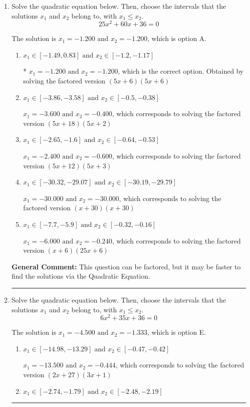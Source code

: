\documentclass{extbook}[14pt]
\newcommand{\litem}[1]{\item #1

\rule{\textwidth}{0.4pt}}
\begin{document}
\begin{enumerate}\litem{
Solve the quadratic equation below. Then, choose the intervals that the solutions $x_1$ and $x_2$ belong to, with $x_1 \leq x_2$.
\[ 25x^{2} +60 x + 36 = 0 \]

The solution is \( x_1 = -1.200 \text{ and } x_2 = -1.200 \), which is option A.\begin{enumerate}[label=\Alph*.]
\item \( x_1 \in [-1.49, 0.83] \text{ and } x_2 \in [-1.2, -1.17] \)

* $x_1 = -1.200 \text{ and } x_2 = -1.200$, which is the correct option. Obtained by solving the factored version $(5x + 6)(5x + 6)$
\item \( x_1 \in [-3.86, -3.58] \text{ and } x_2 \in [-0.5, -0.38] \)

$x_1 = -3.600 \text{ and } x_2 = -0.400$, which corresponds to solving the factored version $(5x + 18)(5x + 2)$
\item \( x_1 \in [-2.65, -1.6] \text{ and } x_2 \in [-0.64, -0.53] \)

$x_1 = -2.400 \text{ and } x_2 = -0.600$, which corresponds to solving the factored version $(5x + 12)(5x + 3)$
\item \( x_1 \in [-30.32, -29.07] \text{ and } x_2 \in [-30.19, -29.79] \)

$x_1 = -30.000 \text{ and } x_2 = -30.000$, which corresponds to solving the factored version $(x + 30)(x + 30)$
\item \( x_1 \in [-7.7, -5.9] \text{ and } x_2 \in [-0.32, -0.16] \)

$x_1 = -6.000 \text{ and } x_2 = -0.240$, which corresponds to solving the factored version $(x + 6)(25x + 6)$
\end{enumerate}

\textbf{General Comment:} This question can be factored, but it may be faster to find the solutions via the Quadratic Equation.
}
\litem{
Solve the quadratic equation below. Then, choose the intervals that the solutions $x_1$ and $x_2$ belong to, with $x_1 \leq x_2$.
\[ 6x^{2} +35 x + 36 = 0 \]

The solution is \( x_1 = -4.500 \text{ and } x_2 = -1.333 \), which is option E.\begin{enumerate}[label=\Alph*.]
\item \( x_1 \in [-14.98, -13.29] \text{ and } x_2 \in [-0.47, -0.42] \)

$x_1 = -13.500 \text{ and } x_2 = -0.444$, which corresponds to solving the factored version $(2x + 27)(3x + 1)$
\item \( x_1 \in [-2.74, -1.79] \text{ and } x_2 \in [-2.48, -2.19] \)


\end{enumerate}}
\end{enumerate}
\end{document}
